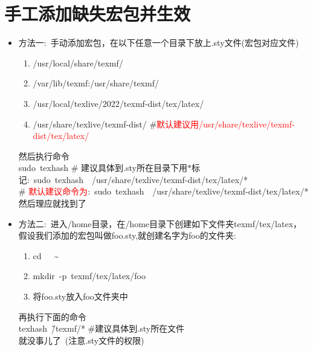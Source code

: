 \documentclass[10pt, oneside, a4paper]{article}      %
\begin{document}
\section{手工添加缺失宏包并生效}

\begin{itemize}
	\item 方法一:~手动添加宏包，在以下任意一个目录下放上\textrm{.sty}文件(宏包对应文件)
		\begin{enumerate}
			\item \textrm{/usr/local/share/texmf/}
			\item \textrm{/var/lib/texmf:/usr/share/texmf/}
			\item \textrm{/usr/local/texlive/2022/texmf-dist/tex/latex/}
			\item \textrm{/usr/share/texlive/texmf-dist/} \qquad\#\textcolor{red}{默认建议用\textrm{/usr/share/texlive/texmf-dist/tex/latex/}}
		\end{enumerate}
然后执行命令\\
\textrm{sudo~texhash} \qquad\# 建议具体到\textrm{.sty}所在目录下用$\ast$标记:~\textrm{sudo~texhash~~/usr/share/texlive/texmf-dist/tex/latex/*}\\
\# \textcolor{red}{默认建议命令为}:~\textrm{sudo~texhash~~/usr/share/texlive/texmf-dist/tex/latex/*}\\
然后理应就找到了
\item 方法二:~进入\textrm{/home}目录，在\textrm{/home}目录下创建如下文件夹\textrm{texmf/tex/latex}，假设我们添加的宏包叫做\textrm{foo.sty},就创建名字为\textrm{foo}的文件夹:
	\begin{enumerate}
		\item \textrm{cd~~~\~}
		\item \textrm{mkdir~-p~texmf/tex/latex/foo}
		\item 将\textrm{foo.sty}放入\textrm{foo}文件夹中
	\end{enumerate}
再执行下面的命令\\
\textrm{texhash~\~/texmf/*} \#建议具体到\textrm{.sty}所在文件\\
就没事儿了~(注意\textrm{.sty}文件的权限)


\end{itemize}
\end{document}
